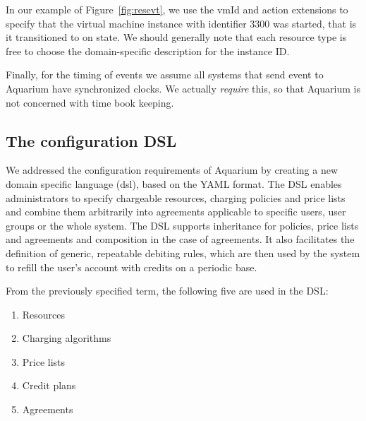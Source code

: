 \documentclass[preprint,10pt]{sigplanconf}
\begin{document}
In our example of Figure~\ref{fig:resevt}, we use the \textsf{vmId} and \textsf{action} extensions to specify that the virtual machine instance with identifier \textsf{3300} was started, that is it transitioned to \textsf{on} state. We should generally note that each resource type is free to choose the domain-specific description for the instance \textsf{ID}. 

Finally, for the timing of events we assume all systems that send event to Aquarium have synchronized clocks. We actually \textit{require} this, so that Aquarium is not concerned with time book keeping.


\subsection{The configuration DSL}
\label{sec:dsl}
We addressed the configuration requirements of Aquarium by creating a new
domain specific language ({\sc dsl}), based on the YAML format.  The DSL
enables administrators to specify chargeable resources, charging policies and
price lists and combine them arbitrarily into agreements applicable to specific
users, user groups or the whole system. 
The DSL supports inheritance for policies, price lists and agreements and composition in the case of agreements.
It also facilitates the
definition of generic, repeatable debiting rules, which are then used by the
system to refill the user's account with credits on a periodic base.

From the previously specified term, the following five are used in the DSL:

\begin{enumerate}
\item Resources
\item Charging algorithms
\item Price lists
\item Credit plans
\item Agreements
\end{enumerate}
\end{document}
